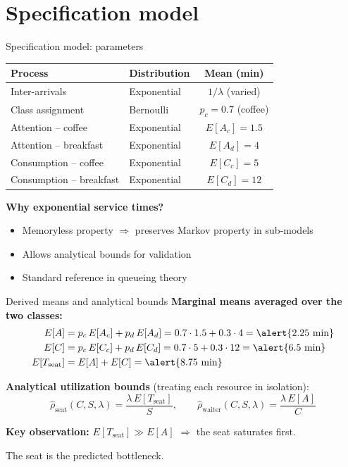 \documentclass[10pt,aspectratio=169]{beamer}
\begin{document}
\section{Specification model}
\begin{frame}{Specification model: parameters}
\begin{table}
\centering
\begin{tabular}{l l c}
\toprule
Process & Distribution & Mean (min) \\
\midrule
Inter-arrivals          & Exponential & $1/\lambda$ (varied) \\
Class assignment        & Bernoulli   & $p_c = 0.7$ (coffee) \\
Attention -- coffee     & Exponential & $E[A_c] = 1.5$ \\
Attention -- breakfast  & Exponential & $E[A_d] = 4$ \\
Consumption -- coffee   & Exponential & $E[C_c] = 5$ \\
Consumption -- breakfast& Exponential & $E[C_d] = 12$ \\
\bottomrule
\end{tabular}
\end{table}

\vspace{0.3cm}
\textbf{Why exponential service times?}
\begin{itemize}
  \item Memoryless property $\Rightarrow$ preserves Markov property in sub-models
  \item Allows analytical bounds for validation
  \item Standard reference in queueing theory
\end{itemize}
\end{frame}

\begin{frame}{Derived means and analytical bounds}
\textbf{Marginal means averaged over the two classes:}
\begin{align*}
E[A] &= p_c\,E[A_c] + p_d\,E[A_d] = 0.7\cdot 1.5 + 0.3\cdot 4 = \alert{2.25 \text{ min}} \\
E[C] &= p_c\,E[C_c] + p_d\,E[C_d] = 0.7\cdot 5 + 0.3\cdot 12 = \alert{6.5 \text{ min}} \\
E[T_{\text{seat}}] &= E[A] + E[C] = \alert{8.75 \text{ min}}
\end{align*}

\vspace{0.3cm}
\textbf{Analytical utilization bounds} (treating each resource in isolation):
\[
\hat\rho_{\text{seat}}(C,S,\lambda) = \frac{\lambda\,E[T_{\text{seat}}]}{S}, \qquad
\hat\rho_{\text{waiter}}(C,S,\lambda) = \frac{\lambda\,E[A]}{C}
\]

\vspace{0.3cm}
\textbf{Key observation:} $E[T_{\text{seat}}] \gg E[A]$ $\Rightarrow$ the seat saturates first.

\hfill\alert{The seat is the predicted bottleneck.}
\end{frame}
\end{document}
